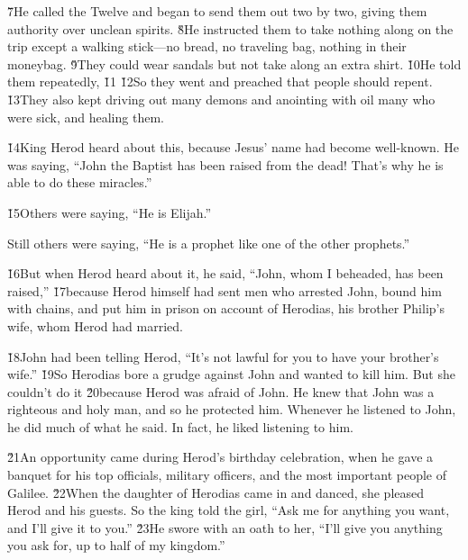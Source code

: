 \v{7}He called the Twelve and began to send them out two by two, giving them authority over unclean spirits. \v{8}He instructed them to take nothing along on the trip except a walking stick---no bread, no traveling bag, nothing in their moneybag. \v{9}They could wear sandals but not take along an extra shirt. \v{10}He told them repeatedly,  \v{11} \v{12}So they went and preached that people should repent. \v{13}They also kept driving out many demons and anointing with oil many who were sick, and healing them.

\v{14}King Herod heard about this, because Jesus' name had become well-known. He was saying, ``John the Baptist has been raised from the dead! That's why he is able to do these miracles.''

\v{15}Others were saying, ``He is Elijah.''

Still others were saying, ``He is a prophet like one of the other prophets.''

\v{16}But when Herod heard about it, he said, ``John, whom I beheaded, has been raised,'' \v{17}because Herod himself had sent men who arrested John, bound him with chains, and put him in prison on account of Herodias, his brother Philip's wife, whom Herod had married.

\v{18}John had been telling Herod, ``It's not lawful for you to have your brother's wife.'' \v{19}So Herodias bore a grudge against John and wanted to kill him. But she couldn't do it \v{20}because Herod was afraid of John. He knew that John was a righteous and holy man, and so he protected him. Whenever he listened to John, he did much of what he said. In fact, he liked listening to him.

\v{21}An opportunity came during Herod's birthday celebration, when he gave a banquet for his top officials, military officers, and the most important people of Galilee. \v{22}When the daughter of Herodias came in and danced, she pleased Herod and his guests. So the king told the girl, ``Ask me for anything you want, and I'll give it to you.'' \v{23}He swore with an oath to her, ``I'll give you anything you ask for, up to half of my kingdom.''

